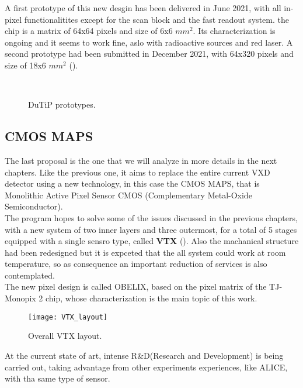 A first prototype of this new desgin has been delivered in June 2021, with all in-pixel functionalitites except for the scan block and the fast readout system. the chip is a matrix of 64x64 pixels and size of 6x6 $mm^{2}$. Its characterization is ongoing and it seems to work fine, aslo with radioactive sources and red laser. A second prototype had been submitted in December 2021, with 64x320 pixels and size of 18x6 $mm^{2}$ (). 


\begin{figure}[h!]
\centering
{}\quad
{}\\
\caption{DuTiP prototypes.}
\label{fig:dutip_matrix}
\end{figure}



\subsection{CMOS MAPS}

The last proposal is the one that we will analyze in more details in the next chapters. Like the previous one, it aims to replace the entire current VXD detector using a new technology, in this case the CMOS MAPS, that is Monolithic Active Pixel Sensor CMOS (Complementary Metal-Oxide Semiconductor). \\
The program hopes to solve some of the issues discussed in the previous chapters, with a new system of two inner layers and three outermost, for a total of 5 stages equipped with a single sensro type, called \textbf{VTX} (). Also the machanical structure had been redesigned but it is expceted that the all system could work at room temperature, so as consequence an important reduction of services is also contemplated.\\
The new pixel design is called OBELIX, based on the pixel matrix of the TJ-Monopix 2 chip, whose characterization is the main topic of this work. 

\begin{figure}[h!]
\centering
\texttt{[image: VTX\_layout]}
\caption{Overall VTX layout.}
\label{VTX_layout}
\end{figure}

At the current state of art, intense R\&D(Research and Development) is being carried out, taking advantage from other experiments experiences, like ALICE, with tha same type of sensor.

